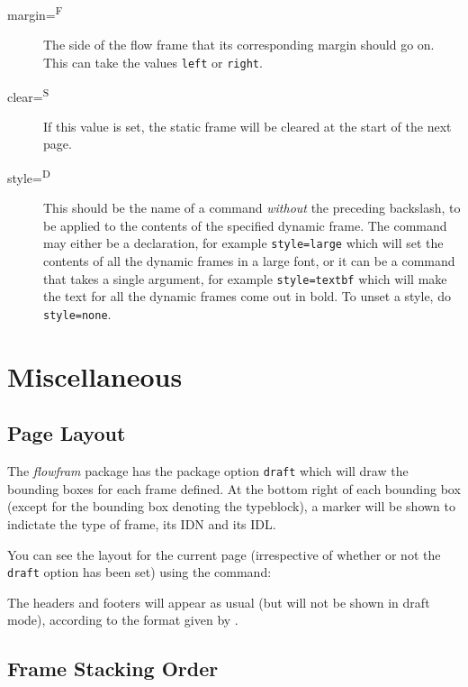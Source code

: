 \documentclass{article}
\begin{document}
\begin{description}
\item[margin=\textsuperscript{F}]\mbox{}\par The side of
the flow frame that its corresponding margin should go on. This
can take the values \texttt{left} or \texttt{right}.

\item[clear=\textsuperscript{S}] If this value
is set, the static frame will be cleared at the start of the
next page.

\item[style=\textsuperscript{D}]\mbox{}\par This should be
the name of a command \emph{without} the preceding backslash,
to be applied to the contents of the specified dynamic frame.
The command may either be a declaration, for example \verb/style=large/
which will set the contents of all the dynamic frames in a
large font, or it can be a command that takes a single argument,
for example \verb/style=textbf/
which will make the text for all the dynamic frames come out in
bold.  To unset a style, do \verb/style=none/.

\end{description}

\chapter{Miscellaneous}

\section*{Page Layout}

The \textsl{flowfram} package has the package option \texttt{draft}
which will draw the {bounding boxes} for
each frame defined.  At the bottom right of each
bounding box (except for the bounding box denoting the
typeblock), a marker will be shown to indictate the type
of frame, its IDN and its IDL.

You can see the layout for the current page (irrespective of
whether or not the \texttt{draft} option has been set) using
the command:\newline
{}

The headers and footers will appear as usual (but will not
be shown in draft mode), according to the format given by
.

\section*{Frame Stacking Order}
\end{document}
